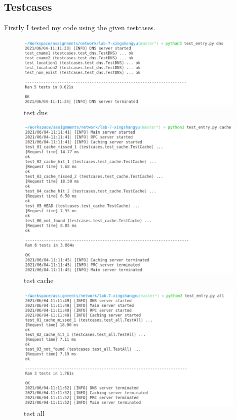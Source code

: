 \documentclass[12pt,a4paper,UTF8]{article}
\begin{document}
\subsection{Testcases}
Firstly I tested my code using the given testcases.
\begin{figure}[htbp]
	\centering
	\includegraphics[width=\textwidth]{1}
	\caption{test dns}
\end{figure}
\begin{figure}[htbp]
	\centering
	\includegraphics[width=\textwidth]{2}
	\caption{test cache}
\end{figure}
\begin{figure}[htbp]
	\centering
	\includegraphics[width=\textwidth]{3}
	\caption{test all}
\end{figure}
\end{document}
